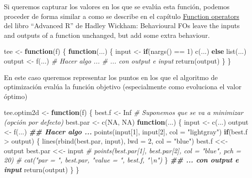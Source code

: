 \documentclass[
]{book}
\newenvironment{Shaded}{\begin{snugshade}}{\end{snugshade}}
\newcommand{\AttributeTok}[1]{\textcolor[rgb]{0.77,0.63,0.00}{#1}}
\newcommand{\CommentTok}[1]{\textcolor[rgb]{0.56,0.35,0.01}{\textit{#1}}}
\newcommand{\ConstantTok}[1]{\textcolor[rgb]{0.00,0.00,0.00}{#1}}
\newcommand{\ControlFlowTok}[1]{\textcolor[rgb]{0.13,0.29,0.53}{\textbf{#1}}}
\newcommand{\DecValTok}[1]{\textcolor[rgb]{0.00,0.00,0.81}{#1}}
\newcommand{\DocumentationTok}[1]{\textcolor[rgb]{0.56,0.35,0.01}{\textbf{\textit{#1}}}}
\newcommand{\FunctionTok}[1]{\textcolor[rgb]{0.00,0.00,0.00}{#1}}
\newcommand{\NormalTok}[1]{#1}
\newcommand{\OtherTok}[1]{\textcolor[rgb]{0.56,0.35,0.01}{#1}}
\newcommand{\SpecialCharTok}[1]{\textcolor[rgb]{0.00,0.00,0.00}{#1}}
\newcommand{\StringTok}[1]{\textcolor[rgb]{0.31,0.60,0.02}{#1}}
\theoremstyle{break}
\theoremstyle{definition}
\theoremstyle{definition}
\theoremstyle{definition}
\theoremstyle{definition}
\theoremstyle{remark}
\begin{document}
Si queremos capturar los valores en los que se evalúa esta función,
podemos proceder de forma similar a como se describe en el capítulo
\href{http://adv-r.had.co.nz/Function-operators.html\#behavioural-fos}{Function operators}
del libro ``Advanced R'' de Hadley Wickham:
Behavioural FOs leave the inputs and outputs of a function unchanged,
but add some extra behaviour.

\begin{Shaded}
\begin{Highlighting}[]
\NormalTok{tee }\OtherTok{\textless{}{-}} \ControlFlowTok{function}\NormalTok{(f) \{}
  \ControlFlowTok{function}\NormalTok{(...) \{}
\NormalTok{    input }\OtherTok{\textless{}{-}} \ControlFlowTok{if}\NormalTok{(}\FunctionTok{nargs}\NormalTok{() }\SpecialCharTok{==} \DecValTok{1}\NormalTok{) }\FunctionTok{c}\NormalTok{(...) }\ControlFlowTok{else} \FunctionTok{list}\NormalTok{(...)}
\NormalTok{    output }\OtherTok{\textless{}{-}} \FunctionTok{f}\NormalTok{(...)}
    \CommentTok{\# Hacer algo ...}
    \CommentTok{\# ... con output e input}
    \FunctionTok{return}\NormalTok{(output)}
\NormalTok{  \}}
\NormalTok{\}}
\end{Highlighting}
\end{Shaded}

En este caso queremos representar los puntos en los que el algoritmo de optimización
evalúa la función objetivo (especialmente como evoluciona el valor óptimo)

\begin{Shaded}
\begin{Highlighting}[]
\NormalTok{tee.optim2d }\OtherTok{\textless{}{-}} \ControlFlowTok{function}\NormalTok{(f) \{}
\NormalTok{  best.f }\OtherTok{\textless{}{-}} \ConstantTok{Inf}   \CommentTok{\# Suponemos que se va a minimizar (opción por defecto)}
\NormalTok{  best.par }\OtherTok{\textless{}{-}} \FunctionTok{c}\NormalTok{(}\ConstantTok{NA}\NormalTok{, }\ConstantTok{NA}\NormalTok{)   }
  \ControlFlowTok{function}\NormalTok{(...) \{}
\NormalTok{    input }\OtherTok{\textless{}{-}} \FunctionTok{c}\NormalTok{(...)}
\NormalTok{    output }\OtherTok{\textless{}{-}} \FunctionTok{f}\NormalTok{(...)}
    \DocumentationTok{\#\# Hacer algo ...}
    \FunctionTok{points}\NormalTok{(input[}\DecValTok{1}\NormalTok{], input[}\DecValTok{2}\NormalTok{], }\AttributeTok{col =} \StringTok{"lightgray"}\NormalTok{)}
    \ControlFlowTok{if}\NormalTok{(best.f }\SpecialCharTok{\textgreater{}}\NormalTok{ output) \{}
      \FunctionTok{lines}\NormalTok{(}\FunctionTok{rbind}\NormalTok{(best.par, input), }\AttributeTok{lwd =} \DecValTok{2}\NormalTok{, }\AttributeTok{col =} \StringTok{"blue"}\NormalTok{)}
\NormalTok{      best.f }\OtherTok{\textless{}\textless{}{-}}\NormalTok{ output}
\NormalTok{      best.par }\OtherTok{\textless{}\textless{}{-}}\NormalTok{ input}
      \CommentTok{\# points(best.par[1], best.par[2], col = "blue", pch = 20)}
      \CommentTok{\# cat("par = ", best.par, "value = ", best.f, "\textbackslash{}n")}
\NormalTok{    \} }
    \DocumentationTok{\#\# ... con output e input}
    \FunctionTok{return}\NormalTok{(output)}
\NormalTok{  \}}
\NormalTok{\}}
\end{Highlighting}
\end{Shaded}
\end{document}
